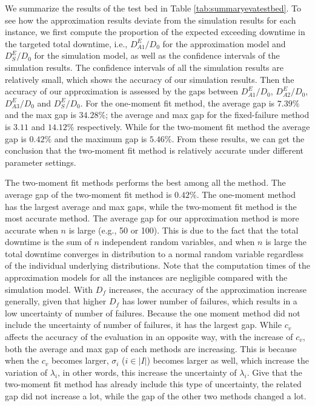 \documentclass[preprint,12pt]{elsarticle}
\begin{document}
We summarize the results of the test bed in Table \ref{tab:summaryevatestbed}. To see how the approximation results deviate from the simulation results for each instance, we first compute the proportion of the expected exceeding downtime in the targeted total downtime, i.e., $D_{A1}^{E}/D_0$ for the approximation model and $D_{S}^{E}/D_0$ for the simulation model, as well as the confidence intervals of the simulation results. The confidence intervals of all the simulation results are relatively small, which shows the accuracy of our simulation results. Then the accuracy of our approximation is assessed by the gaps between $D_{A1}^{E}/D_0$, $D_{A2}^{E}/D_0$, $D_{A3}^{E}/D_0$ and $D_{S}^{E}/D_0$. For the one-moment fit method, the average gap is $7.39\%$ and the max gap is $34.28\%$; the average and max gap for the fixed-failure method is $3.11$ and $14.12\%$ respectively. While for the two-moment fit method the average gap is $0.42\%$ and the maximum gap is $5.46\%$. From these results, we can get the conclusion that the two-moment fit method is relatively accurate under different parameter settings.

 The two-moment fit methods performs the best among all the method. The average gap of the two-moment fit method is $0.42\%$. The one-moment method has the largest average and max gaps, while the two-moment fit method is the most accurate method. The average gap for
 our approximation method is more accurate when $n$ is large (e.g., 50 or 100). This is due to the fact that the total downtime is the sum of $n$ independent random variables, and when $n$ is large the total downtime converges in distribution to a normal random variable regardless of the individual underlying distributions. Note that the computation times of the approximation models for all the instances are negligible compared with the simulation model. With $D_{f}$ increases, the accuracy of the approximation increase generally, given that higher $D_{f}$ has lower number of failures, which results in a low uncertainty of number of failures. Because the one moment method did not include the uncertainty of number of failures, it has the largest gap. While $c_v$ affects the accuracy of the evaluation in an opposite way, with the increase of $c_v$, both the average and max gap of each methods are increasing. This is because when the $c_v$ becomes larger, $\sigma_{i}$ ($ i\in \rvert I \lvert $) becomes larger as well, which increase the variation of $\lambda_{i}$, in other words, this increase the uncertainty of $\lambda_{i}$. Give that the two-moment fit method has already include this type of uncertainty, the related gap did not increase a lot, while the gap of the other two methods changed a lot.
\end{document}
